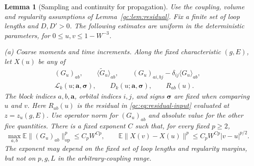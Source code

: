\documentclass[11pt]{article}
\numberwithin{equation}{section}
\newtheorem{lemma}[theorem]{Lemma}
\theoremstyle{remark}
\newcommand{\E}{\mathbb E}
\newcommand{\wt}{\widetilde}
\newcommand{\cL}{\mathcal L}
\newcommand{\op}{\mathrm{op}}
\begin{document}
\begin{lemma}[Sampling and continuity for propagation]
\label{fo:lem:sampling-continuity}
Use the coupling, volume and regularity assumptions of
Lemma~\ref{gc:lem:residual}. Fix a finite set of loop lengths and $D,D'>0$.
The following estimates are uniform in the deterministic parameters,
for $0\le u,v\le1-W^{-3}$.

\textup{(a) Coarse moments and time increments.}
Along the fixed characteristic $(g,E)$, let $X(u)$ be any of
\[
 \begin{gathered}
 (G_u)_{ab},\qquad \langle\wt G_u\rangle_{ab},\qquad
 (G_u)_{ai,bj}-\delta_{ij}\langle G_u\rangle_{ab},\\
 \cL_k(u;\boldsymbol a,\boldsymbol\sigma),\qquad
 D_k(u;\boldsymbol a,\boldsymbol\sigma),\qquad R_{ab}(u).
 \end{gathered}
\]
The block indices $a,b,\boldsymbol a$, orbital indices $i,j$, and signs
$\boldsymbol\sigma$ are fixed when comparing $u$ and $v$.
Here $R_{ab}(u)$ is the residual in \eqref{gc:eq:residual-input} evaluated
at $z=z_u(g,E)$. Use operator norm for $(G_u)_{ab}$ and absolute value
for the other five quantities.
There is a fixed exponent $C$ such that, for every fixed $p\ge2$,
\begin{equation}\label{fo:eq:coarse-time-input}
 \max_{a,b}\E\|(G_u)_{ab}\|_{\op}^p\le C_pW^{Cp},\qquad
 \E\|X(v)-X(u)\|^p\le C_pW^{Cp}|v-u|^{p/2}.
\end{equation}
The exponent may depend on the fixed set of loop lengths and regularity
margins, but not on $p,g,L$ in the arbitrary-coupling range.


\end{lemma}
\end{document}
